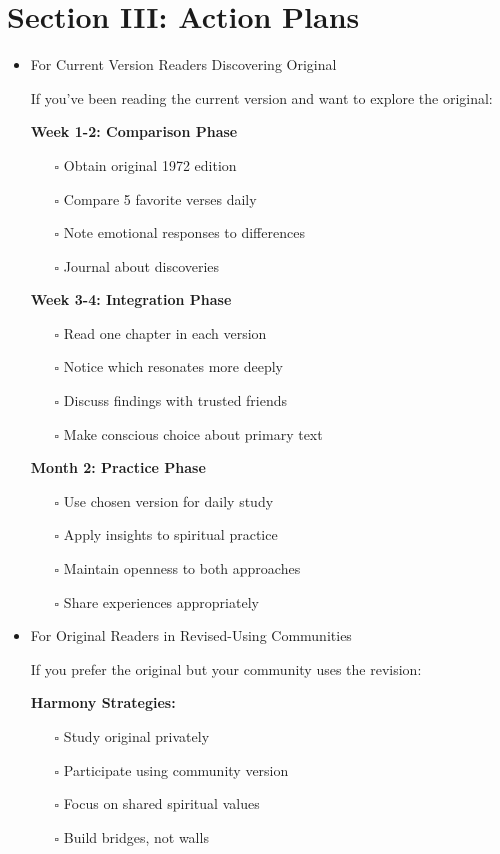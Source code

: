 \documentclass[11pt,twoside]{book}
\begin{document}
\section*{Section III: Action Plans}
\label{sec:org24ad827}

\begin{itemize}
\item For Current Version Readers Discovering Original
\label{sec:orgd54937b}

If you've been reading the current version and want to explore the original:

\textbf{\textbf{Week 1-2: Comparison Phase}}
\begin{itemize}
\item[{$\square$}] Obtain original 1972 edition
\item[{$\square$}] Compare 5 favorite verses daily
\item[{$\square$}] Note emotional responses to differences
\item[{$\square$}] Journal about discoveries
\end{itemize}

\textbf{\textbf{Week 3-4: Integration Phase}}
\begin{itemize}
\item[{$\square$}] Read one chapter in each version
\item[{$\square$}] Notice which resonates more deeply
\item[{$\square$}] Discuss findings with trusted friends
\item[{$\square$}] Make conscious choice about primary text
\end{itemize}

\textbf{\textbf{Month 2: Practice Phase}}
\begin{itemize}
\item[{$\square$}] Use chosen version for daily study
\item[{$\square$}] Apply insights to spiritual practice
\item[{$\square$}] Maintain openness to both approaches
\item[{$\square$}] Share experiences appropriately
\end{itemize}
\item For Original Readers in Revised-Using Communities
\label{sec:org790c773}

If you prefer the original but your community uses the revision:

\textbf{\textbf{Harmony Strategies:}}
\begin{itemize}
\item[{$\square$}] Study original privately
\item[{$\square$}] Participate using community version
\item[{$\square$}] Focus on shared spiritual values
\item[{$\square$}] Build bridges, not walls
\end{itemize}


\end{itemize}
\end{document}
